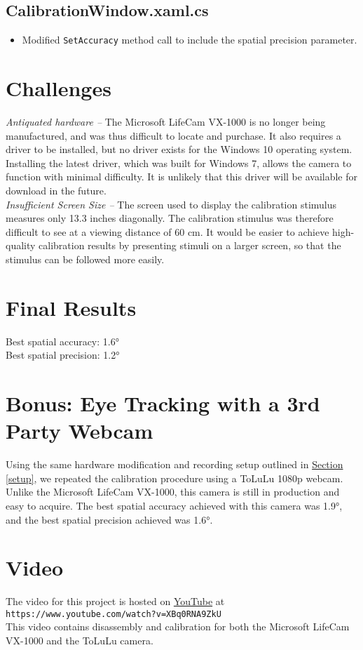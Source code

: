 \documentclass[11pt]{article}
\begin{document}
\subsection*{CalibrationWindow.xaml.cs}
    \begin{itemize}
        \item Modified \texttt{SetAccuracy} method call to include the spatial precision parameter.
    \end{itemize}

\section{Challenges} %
\textit{Antiquated hardware -- }The Microsoft LifeCam VX-1000 is no longer being manufactured, and was thus difficult to locate and purchase. It also requires a driver to be installed, but no driver exists for the Windows 10 operating system. Installing the latest driver, which was built for Windows 7, allows the camera to function with minimal difficulty. It is unlikely that this driver will be available for download in the future. \\
\textit{Insufficient Screen Size -- } The screen used to display the calibration stimulus measures only 13.3 inches diagonally. The calibration stimulus was therefore difficult to see at a viewing distance of 60 cm. It would be easier to achieve high-quality calibration results by presenting stimuli on a larger screen, so that the stimulus can be followed more easily.
\section{Final Results} %
Best spatial accuracy: \ang{1.6} \\
Best spatial precision: \ang{1.2}

\section{Bonus: Eye Tracking with a 3rd Party Webcam}
Using the same hardware modification and recording setup outlined in \hyperref[setup]{Section \ref{setup}}, we repeated the calibration procedure using a ToLuLu 1080p webcam. Unlike the Microsoft LifeCam VX-1000, this camera is still in production and easy to acquire. The best spatial accuracy achieved with this camera was \ang{1.9}, and the best spatial precision achieved was \ang{1.6}.

\section{Video}
The video for this project is hosted on \href{https://www.youtube.com/watch?v=XBq0RNA9ZkU}{YouTube} at \texttt{https://www.youtube.com/watch?v=XBq0RNA9ZkU} \\
This video contains disassembly and calibration for both the Microsoft LifeCam VX-1000 and the ToLuLu camera.

\end{document}
